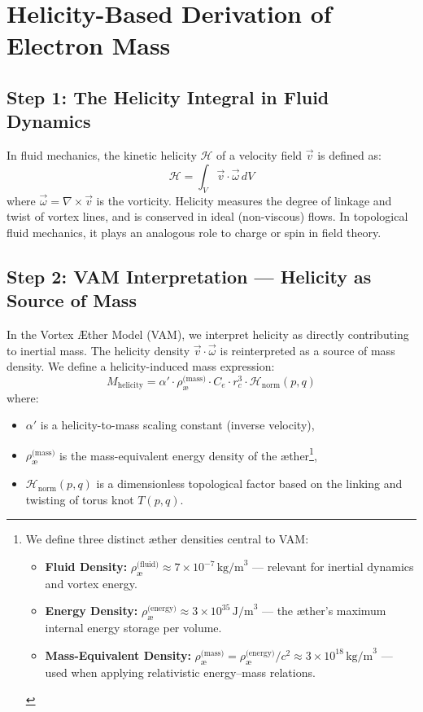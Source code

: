 \section{Helicity-Based Derivation of Electron Mass}

\subsection*{Step 1: The Helicity Integral in Fluid Dynamics}

In fluid mechanics, the kinetic helicity \( \mathcal{H} \) of a velocity field \( \vec{v} \) is defined as:
\[
\boxed{
\mathcal{H} = \int_V \vec{v} \cdot \vec{\omega} \, dV
}
\tag{1}
\]
where \( \vec{\omega} = \nabla \times \vec{v} \) is the vorticity. Helicity measures the degree of linkage and twist of vortex lines, and is conserved in ideal (non-viscous) flows. In topological fluid mechanics, it plays an analogous role to charge or spin in field theory.

\subsection*{Step 2: VAM Interpretation — Helicity as Source of Mass}

In the Vortex Æther Model (VAM), we interpret helicity as directly contributing to inertial mass. The helicity density \( \vec{v} \cdot \vec{\omega} \) is reinterpreted as a source of mass density. We define a helicity-induced mass expression:
\[
M_{\text{helicity}} = \alpha' \cdot \rho_\text{\ae}^{\text{(mass)}} \cdot C_e \cdot r_c^3 \cdot \mathcal{H}_{\text{norm}}(p,q)
\tag{2}
\]
where:
\begin{itemize}
    \item \( \alpha' \) is a helicity-to-mass scaling constant (inverse velocity),
    \item \( \rho_\text{\ae}^{\text{(mass)}} \) is the mass-equivalent energy density of the æther\footnote{We define three distinct æther densities central to VAM:

\begin{itemize}
    \item \textbf{Fluid Density:} \( \rho_\text{\ae}^{\text{(fluid)}} \approx 7 \times 10^{-7} \, \text{kg/m}^3 \) — relevant for inertial dynamics and vortex energy.
    \item \textbf{Energy Density:} \( \rho_\text{\ae}^{\text{(energy)}} \approx 3 \times 10^{35} \, \text{J/m}^3 \) — the æther’s maximum internal energy storage per volume.
    \item \textbf{Mass-Equivalent Density:} \( \rho_\text{\ae}^{\text{(mass)}} = \rho_\text{\ae}^{\text{(energy)}} / c^2 \approx 3 \times 10^{18} \, \text{kg/m}^3 \) — used when applying relativistic energy–mass relations.
\end{itemize}
},
    \item \( \mathcal{H}_{\text{norm}}(p,q) \) is a dimensionless topological factor based on the linking and twisting of torus knot \( T(p,q) \).
\end{itemize}

